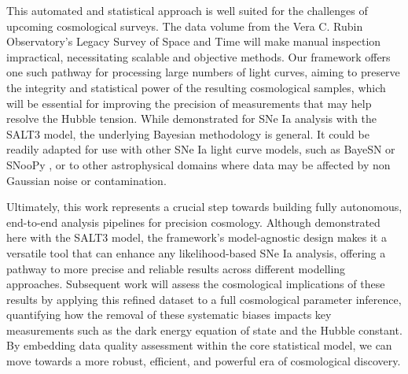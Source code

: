 This automated and statistical approach is well suited for the challenges of upcoming cosmological surveys. The data volume from the Vera C. Rubin Observatory's Legacy Survey of Space and Time will make manual inspection impractical, necessitating scalable and objective methods. Our framework offers one such pathway for processing large numbers of light curves, aiming to preserve the integrity and statistical power of the resulting cosmological samples, which will be essential for improving the precision of measurements that may help resolve the Hubble tension. While demonstrated for SNe Ia analysis with the SALT3 model, the underlying Bayesian methodology is general. It could be readily adapted for use with other SNe Ia light curve models, such as BayeSN \citep{Thorp2022} or SNooPy \citep{Burns2011}, or to other astrophysical domains where data may be affected by non Gaussian noise or contamination.

Ultimately, this work represents a crucial step towards building fully autonomous, end-to-end analysis pipelines for precision cosmology. Although demonstrated here with the SALT3 model, the framework's model-agnostic design makes it a versatile tool that can enhance any likelihood-based SNe Ia analysis, offering a pathway to more precise and reliable results across different modelling approaches. Subsequent work will assess the cosmological implications of these results by applying this refined dataset to a full cosmological parameter inference, quantifying how the removal of these systematic biases impacts key measurements such as the dark energy equation of state and the Hubble constant. By embedding data quality assessment within the core statistical model, we can move towards a more robust, efficient, and powerful era of cosmological discovery.

